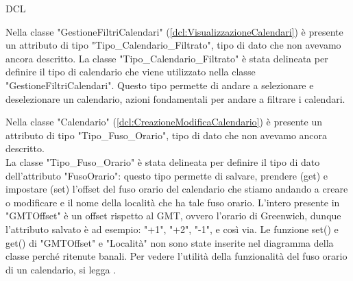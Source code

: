 \begin{listaPersonale}{DCL}
    \begin{center}
        
    \end{center}
    \newpage


    Nella classe "GestioneFiltriCalendari" (\ref{dcl:VisualizzazioneCalendari}) è presente un attributo di tipo "Tipo\_Calendario\_Filtrato", tipo di dato che non avevamo ancora descritto. La classe "Tipo\_Calendario\_Filtrato" è stata delineata per definire il tipo di calendario che viene utilizzato nella classe "GestioneFiltriCalendari". Questo tipo permette di andare a selezionare e deselezionare un calendario, azioni fondamentali per andare a filtrare i calendari.

    \begin{center}
        
    \end{center}




    Nella classe "Calendario" (\ref{dcl:CreazioneModificaCalendario}) è presente un attributo di tipo "Tipo\_Fuso\_Orario", tipo di dato che non avevamo ancora descritto. \\
    La classe "Tipo\_Fuso\_Orario" è stata delineata per definire il tipo di dato dell'attributo "FusoOrario": questo tipo permette di salvare, prendere (get) e impostare (set) l'offset del fuso orario del calendario che stiamo andando a creare o modificare e il nome della località che ha tale fuso orario. L'intero presente in "GMTOffset" è un offset rispetto al GMT, ovvero l'orario di Greenwich, dunque l'attributo salvato è ad esempio: "+1", "+2", "-1", e così via. Le funzione set() e get() di "GMTOffset" e "Località" non sono state inserite nel diagramma della classe perché ritenute banali. Per vedere l'utilità della funzionalità del fuso orario di un calendario, si legga .



\end{listaPersonale}
